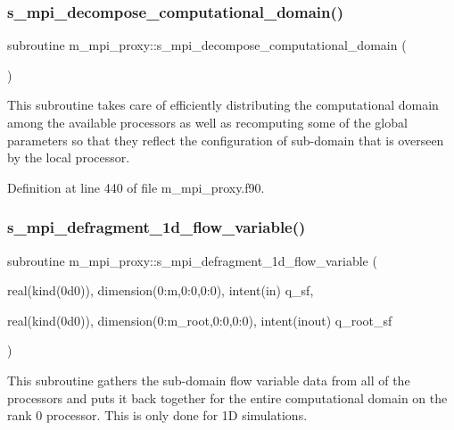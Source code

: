 \subsubsection{\texorpdfstring{s\+\_\+mpi\+\_\+decompose\+\_\+computational\+\_\+domain()}{s\_mpi\_decompose\_computational\_domain()}}
{\footnotesize\ttfamily subroutine m\+\_\+mpi\+\_\+proxy\+::s\+\_\+mpi\+\_\+decompose\+\_\+computational\+\_\+domain (\begin{DoxyParamCaption}{ }\end{DoxyParamCaption})}



This subroutine takes care of efficiently distributing the computational domain among the available processors as well as recomputing some of the global parameters so that they reflect the configuration of sub-\/domain that is overseen by the local processor. 



Definition at line 440 of file m\+\_\+mpi\+\_\+proxy.\+f90.

\mbox{\label{namespacem__mpi__proxy_ae5286531f6390643aad1e4db5d5f6d91}} 
\subsubsection{\texorpdfstring{s\+\_\+mpi\+\_\+defragment\+\_\+1d\+\_\+flow\+\_\+variable()}{s\_mpi\_defragment\_1d\_flow\_variable()}}
{\footnotesize\ttfamily subroutine m\+\_\+mpi\+\_\+proxy\+::s\+\_\+mpi\+\_\+defragment\+\_\+1d\+\_\+flow\+\_\+variable (\begin{DoxyParamCaption}\item[{real(kind(0d0)), dimension(0\+:m,0\+:0,0\+:0), intent(in)}]{q\+\_\+sf,  }\item[{real(kind(0d0)), dimension(0\+:m\+\_\+root,0\+:0,0\+:0), intent(inout)}]{q\+\_\+root\+\_\+sf }\end{DoxyParamCaption})}



This subroutine gathers the sub-\/domain flow variable data from all of the processors and puts it back together for the entire computational domain on the rank 0 processor. This is only done for 1D simulations. 


